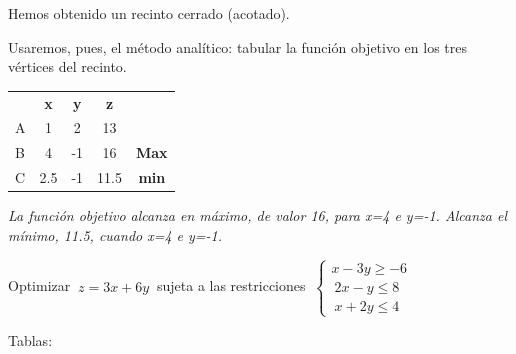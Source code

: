 \vspace{3mm}
\begin{multicols}{2}
Hemos obtenido un recinto cerrado (acotado). 

Usaremos, pues, el método analítico: tabular la función objetivo en los tres vértices del recinto.

	\begin{table}[H]
	\centering
	\begin{tabular}{l|c|c|c|c}
	\textbf{} & \textbf{x} & \textbf{y} & \textbf{z} &              \\ \cline{1-4}
	A         & 1          & 2          & 13         & \textbf{}    \\ \hline
	B         & 4          & -1         & 16         & \textbf{Max} \\ \hline
	C         & 2.5        & -1         & 11.5       & \textbf{min} \\ \hline
	\end{tabular}
	\end{table} 	
	
\end{multicols}

\vspace{3mm} \emph{La función objetivo alcanza en máximo, de valor 16, para x=4 e y=-1. Alcanza el mínimo, 11.5, cuando x=4 e y=-1.}
\vspace{10mm}




\begin{ejemplo}
\begin{ejer}
	Optimizar $\ z=3x+6y\ $ sujeta a las restricciones $\ \begin{cases} x-3y\ge -6 \\ \ 2x-y \le 8 \\ \ x+2y\le 4 \end{cases}$
\end{ejer}	
\end{ejemplo}
\vspace{5mm}
Tablas:

